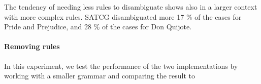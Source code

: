 \documentclass[11pt]{article}
\begin{document}
The tendency of needing less rules to disambiguate shows also in a larger context with more complex rules.
SATCG disambiguated more 17 \% of the cases for Pride and Prejudice, and 28 \% of the cases for Don Quijote.

\paragraph{Removing rules}

In this experiment, we test the performance of the two implementations by working with a smaller grammar and comparing the result to 





\end{document}
